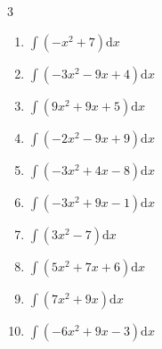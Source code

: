 \begin{multicols}{3}
\begin{enumerate}

\columnbreak %

  \item $\displaystyle \int \left( -x^{2}+7 \right) \mathrm{d}x$


  \item $\displaystyle \int \left( -3x^{2}-9x+4 \right) \mathrm{d}x$


  \item $\displaystyle \int \left( 9x^{2}+9x+5 \right) \mathrm{d}x$


  \item $\displaystyle \int \left( -2x^{2}-9x+9 \right) \mathrm{d}x$


  \item $\displaystyle \int \left( -3x^{2}+4x-8 \right) \mathrm{d}x$


  \item $\displaystyle \int \left( -3x^{2}+9x-1 \right) \mathrm{d}x$


  \item $\displaystyle \int \left( 3x^{2}-7 \right) \mathrm{d}x$


  \item $\displaystyle \int \left( 5x^{2}+7x+6 \right) \mathrm{d}x$


  \item $\displaystyle \int \left( 7x^{2}+9x \right) \mathrm{d}x$


  \item $\displaystyle \int \left( -6x^{2}+9x-3 \right) \mathrm{d}x$


\end{enumerate}
\end{multicols}
